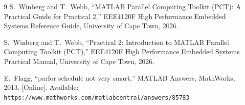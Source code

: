 \documentclass[conference]{IEEEtran}
\begin{document}
\begin{thebibliography}{9}
S.~Winberg and T.~Webb, ``MATLAB Parallel Computing Toolkit (PCT): A Practical
Guide for Practical 2,'' EEE4120F High Performance Embedded Systems Reference
Guide, University of Cape Town, 2026.

S.~Winberg and T.~Webb, ``Practical 2: Introduction to MATLAB Parallel
Computing Toolkit (PCT),'' EEE4120F High Performance Embedded Systems
Practical Manual, University of Cape Town, 2026.

E.~Flagg, ``parfor schedule not very smart,'' MATLAB Answers, MathWorks,
2013. [Online]. Available:
\texttt{https://www.mathworks.com/matlabcentral/answers/85783}
\end{thebibliography}
\end{document}
